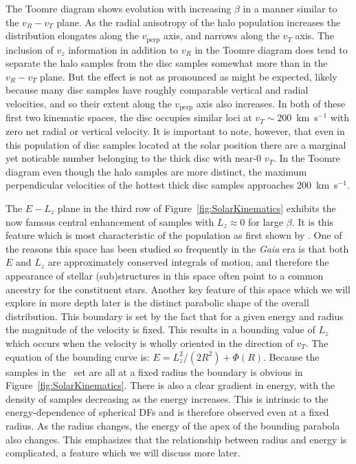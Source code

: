 The Toomre diagram shows evolution with increasing $\beta$ in a manner similar to the $v_{R}-v_{T}$ plane. As the radial anisotropy of the halo population increases the distribution elongates along the $v_\mathrm{perp}$ axis, and narrows along the $v_{T}$ axis. The inclusion of $v_{z}$ information in addition to $v_{R}$ in the Toomre diagram does tend to separate the halo samples from the disc samples somewhat more than in the $v_{R}-v_{T}$ plane. But the effect is not as pronounced as might be expected, likely because many disc samples have roughly comparable vertical and radial velocities, and so their extent along the $v_\mathrm{perp}$ axis also increases. In both of these first two kinematic spaces, the disc occupies similar loci at $v_{T} \sim 200$~km~s$^{-1}$ with zero net radial or vertical velocity. It is important to note, however, that even in this population of disc samples located at the solar position there are a marginal yet noticable number belonging to the thick disc with near-0 $v_{T}$. In the Toomre diagram even though the halo samples are more distinct, the maximum perpendicular velocities of the hottest thick disc samples approaches 200~km~s$^{-1}$. 

The $E-L_{z}$ plane in the third row of Figure~\ref{fig:SolarKinematics} exhibits the now famous central enhancement of samples with $L_{z} \approx 0$ for large $\beta$. It is this feature which is most characteristic of the \gse population as first shown by \textcite{helmi18}. One of the reasons this space has been studied so frequently in the \textit{Gaia} era is that both $E$ and $L_{z}$ are approximately conserved integrals of motion, and therefore the appearance of stellar (sub)structures in this space often point to a common ancestry for the constituent stars. Another key feature of this space which we will explore in more depth later is the distinct parabolic shape of the overall distribution. This boundary is set by the fact that for a given energy and radius the magnitude of the velocity is fixed. This results in a bounding value of $L_{z}$ which occurs when the velocity is wholly oriented in the direction of $v_{T}$. The equation of the bounding curve is: $E = L_{z}^{2}/(2R^{2}) + \Phi(R)$. Because the samples in the \solar\ set are all at a fixed radius the boundary is obvious in Figure~\ref{fig:SolarKinematics}. There is also a clear gradient in energy, with the density of samples decreasing as the energy increases. This is intrinsic to the energy-dependence of spherical DFs \parencite[see chapter 4.3 in ][]{binney08} and is therefore observed even at a fixed radius. As the radius changes, the energy of the apex of the bounding parabola also changes. This emphasizes that the relationship between radius and energy is complicated, a feature which we will discuss more later.

